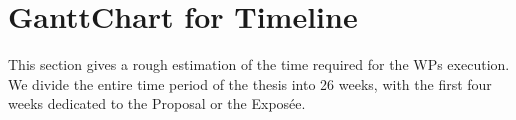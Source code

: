 \section{GanttChart for Timeline}
	


This section gives a rough estimation of the time required for the WPs execution.
We divide the entire time period of the thesis into 26 weeks, with the first four weeks dedicated to the Proposal or the Exposée.

